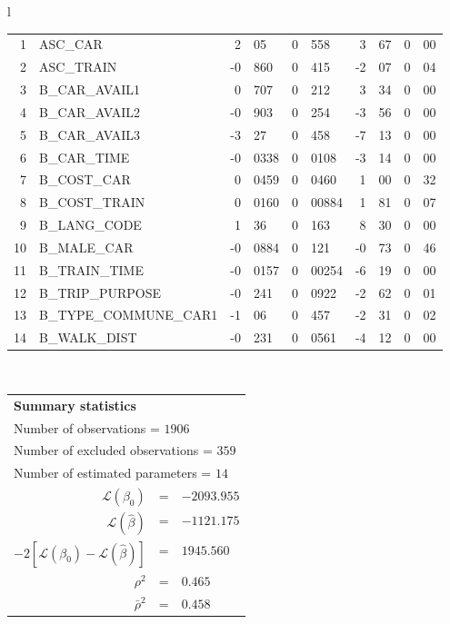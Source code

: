 \begin{tabular}{l}
\begin{tabular}{rlr@{.}lr@{.}lr@{.}lr@{.}l}
1 & ASC_CAR & 2&05 & 0&558 & 3&67 & 0&00\\
2 & ASC_TRAIN & -0&860 & 0&415 & -2&07 & 0&04\\
3 & B_CAR_AVAIL1 & 0&707 & 0&212 & 3&34 & 0&00\\
4 & B_CAR_AVAIL2 & -0&903 & 0&254 & -3&56 & 0&00\\
5 & B_CAR_AVAIL3 & -3&27 & 0&458 & -7&13 & 0&00\\
6 & B_CAR_TIME & -0&0338 & 0&0108 & -3&14 & 0&00\\
7 & B_COST_CAR & 0&0459 & 0&0460 & 1&00 & 0&32\\
8 & B_COST_TRAIN & 0&0160 & 0&00884 & 1&81 & 0&07\\
9 & B_LANG_CODE & 1&36 & 0&163 & 8&30 & 0&00\\
10 & B_MALE_CAR & -0&0884 & 0&121 & -0&73 & 0&46\\
11 & B_TRAIN_TIME & -0&0157 & 0&00254 & -6&19 & 0&00\\
12 & B_TRIP_PURPOSE & -0&241 & 0&0922 & -2&62 & 0&01\\
13 & B_TYPE_COMMUNE_CAR1 & -1&06 & 0&457 & -2&31 & 0&02\\
14 & B_WALK_DIST & -0&231 & 0&0561 & -4&12 & 0&00\\
\hline
\end{tabular}
\\
\begin{tabular}{rcl}
\multicolumn{3}{l}{\bf Summary statistics}\\
\multicolumn{3}{l}{ Number of observations = $1906$} \\
\multicolumn{3}{l}{ Number of excluded observations = $359$} \\
\multicolumn{3}{l}{ Number of estimated  parameters = $14$} \\
 $\mathcal{L}(\beta_0)$ &=&  $-2093.955$ \\
 $\mathcal{L}(\hat{\beta})$ &=& $-1121.175 $  \\
 $-2[\mathcal{L}(\beta_0) -\mathcal{L}(\hat{\beta})]$ &=& $1945.560$ \\
    $\rho^2$ &=&   $0.465$ \\
    $\bar{\rho}^2$ &=&    $0.458$ \\
\end{tabular}
  \end{tabular}

